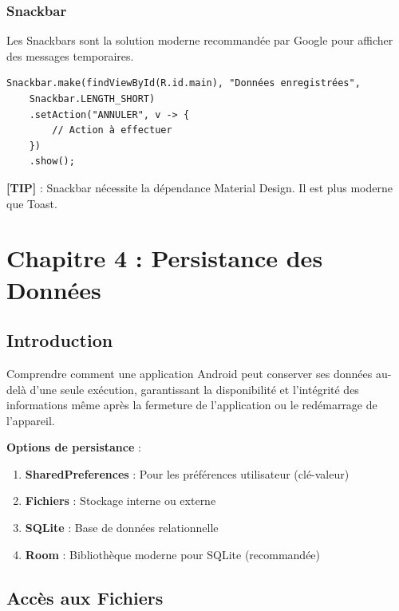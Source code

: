 \documentclass[11pt,a4paper]{article}
\begin{document}
\subsubsection{Snackbar}

Les Snackbars sont la solution moderne recommandée par Google pour afficher des messages temporaires.

\begin{lstlisting}
Snackbar.make(findViewById(R.id.main), "Données enregistrées", 
    Snackbar.LENGTH_SHORT)
    .setAction("ANNULER", v -> {
        // Action à effectuer
    })
    .show();
\end{lstlisting}

\textbf{[TIP]} : Snackbar nécessite la dépendance Material Design. Il est plus moderne que Toast.


\section{Chapitre 4 : Persistance des Données}

\subsection{Introduction}

Comprendre comment une application Android peut conserver ses données au-delà d'une seule exécution, garantissant la disponibilité et l'intégrité des informations même après la fermeture de l'application ou le redémarrage de l'appareil.

\textbf{Options de persistance} :
\begin{enumerate}
    \item \textbf{SharedPreferences} : Pour les préférences utilisateur (clé-valeur)
    \item \textbf{Fichiers} : Stockage interne ou externe
    \item \textbf{SQLite} : Base de données relationnelle
    \item \textbf{Room} : Bibliothèque moderne pour SQLite (recommandée)
\end{enumerate}

\subsection{Accès aux Fichiers}
\end{document}
